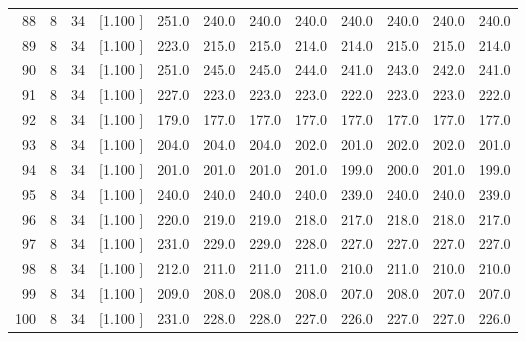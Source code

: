 \documentclass[12pt,a4paper]{article}
\begin{document}
\begin{center}
{\begin{tabular}{r r r r r r r r r r r r}
  88&  8& 34&[1.100     ]&   251.0&   240.0&   240.0&   240.0&   240.0&   240.0&   240.0&   240.0\\[-0.02in]
  89&  8& 34&[1.100     ]&   223.0&   215.0&   215.0&   214.0&   214.0&   215.0&   215.0&   214.0\\[-0.02in]
  90&  8& 34&[1.100     ]&   251.0&   245.0&   245.0&   244.0&   241.0&   243.0&   242.0&   241.0\\[-0.02in]
  91&  8& 34&[1.100     ]&   227.0&   223.0&   223.0&   223.0&   222.0&   223.0&   223.0&   222.0\\[-0.02in]
  92&  8& 34&[1.100     ]&   179.0&   177.0&   177.0&   177.0&   177.0&   177.0&   177.0&   177.0\\[-0.02in]
  93&  8& 34&[1.100     ]&   204.0&   204.0&   204.0&   202.0&   201.0&   202.0&   202.0&   201.0\\[-0.02in]
  94&  8& 34&[1.100     ]&   201.0&   201.0&   201.0&   201.0&   199.0&   200.0&   201.0&   199.0\\[-0.02in]
  95&  8& 34&[1.100     ]&   240.0&   240.0&   240.0&   240.0&   239.0&   240.0&   240.0&   239.0\\[-0.02in]
  96&  8& 34&[1.100     ]&   220.0&   219.0&   219.0&   218.0&   217.0&   218.0&   218.0&   217.0\\[-0.02in]
  97&  8& 34&[1.100     ]&   231.0&   229.0&   229.0&   228.0&   227.0&   227.0&   227.0&   227.0\\[-0.02in]
  98&  8& 34&[1.100     ]&   212.0&   211.0&   211.0&   211.0&   210.0&   211.0&   210.0&   210.0\\[-0.02in]
  99&  8& 34&[1.100     ]&   209.0&   208.0&   208.0&   208.0&   207.0&   208.0&   207.0&   207.0\\[-0.02in]
 100&  8& 34&[1.100     ]&   231.0&   228.0&   228.0&   227.0&   226.0&   227.0&   227.0&   226.0\\[-0.02in]

\hline
\end{tabular}}
\end{center}
\end{document}
